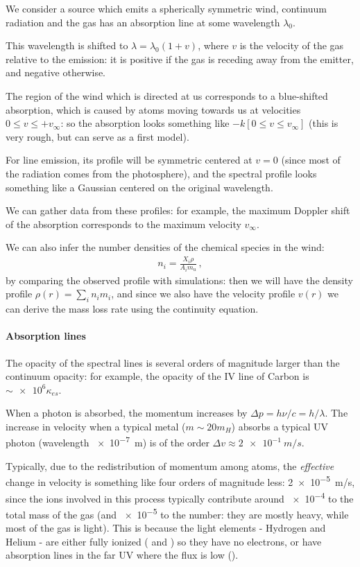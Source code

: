 \documentclass[main.tex]{subfiles}
\begin{document}
We consider a source which emits a spherically symmetric wind, continuum radiation and the gas has an absorption line at some wavelength \(\lambda_0 \). 

This wavelength is shifted to \(\lambda = \lambda_0 (1 + v)\), where \(v\) is the velocity of the gas relative to the emission: it is positive if the gas is receding away from the emitter, and negative otherwise.

The region of the wind which is directed at us corresponds to a blue-shifted absorption, which is caused by atoms moving towards us at velocities \(0 \leq v \leq + v_\infty\): so the absorption looks something like \(- k [0 \leq v \leq v_\infty]\) (this is very rough, but can serve as a first model).

For line emission, its profile will be symmetric centered at \(v=0\) (since most of the radiation comes from the photosphere), and the spectral profile looks something like a Gaussian centered on the original wavelength.

We can gather data from these profiles: for example, the maximum Doppler shift of the absorption corresponds to the maximum velocity \(v_{ \infty }\).

We can also infer the number densities of the chemical species in the wind: 
%
\begin{align}
  n_i  = \frac{X_i \rho }{A_i m_u}
\,,
\end{align}
%
by comparing the observed profile with simulations: then we will have the density profile \(\rho (r) = \sum_i n_i m_i\), and since we also have the velocity profile \(v(r)\) we can derive the mass loss rate using the continuity equation.

\paragraph{Absorption lines}

The opacity of the spectral lines is several orders of magnitude larger than the continuum opacity: for example, the opacity of the IV line of Carbon is \(\sim \num{e6} \kappa_{es}\).

When a photon is absorbed, the momentum increases by \(\Delta p = h \nu / c = h / \lambda \). 
The increase in velocity when a typical metal (\(m \sim 20 m_H\)) absorbs a typical UV photon (wavelength \SI{e-7}{m}) is of the order \(\Delta v \approx \SI{2e-1}{m/s}\). 

Typically, due to the redistribution of momentum among atoms, the \emph{effective} change in velocity is something like four orders of magnitude less: \SI{2e-5}{m/s}, since the ions involved in this process typically contribute around \num{e-4} to the total mass of the gas (and \num{e-5} to the number: they are mostly heavy, while most of the gas is light).
This is because the light elements - Hydrogen and Helium - are either fully ionized ( and ) so they have no electrons, or have absorption lines in the far UV where the flux is low ().
\end{document}
